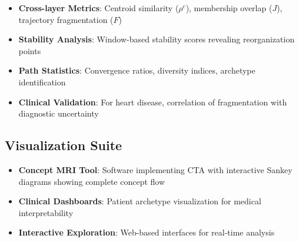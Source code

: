 \begin{itemize}
    \item \textbf{Cross-layer Metrics}: Centroid similarity ($\rho^c$), membership overlap ($J$), trajectory fragmentation ($F$)
    \item \textbf{Stability Analysis}: Window-based stability scores revealing reorganization points
    \item \textbf{Path Statistics}: Convergence ratios, diversity indices, archetype identification
    \item \textbf{Clinical Validation}: For heart disease, correlation of fragmentation with diagnostic uncertainty
\end{itemize}

\subsection{Visualization Suite}

\begin{itemize}
    \item \textbf{Concept MRI Tool}: Software implementing CTA with interactive Sankey diagrams showing complete concept flow
    \item \textbf{Clinical Dashboards}: Patient archetype visualization for medical interpretability
    \item \textbf{Interactive Exploration}: Web-based interfaces for real-time analysis
\end{itemize}


